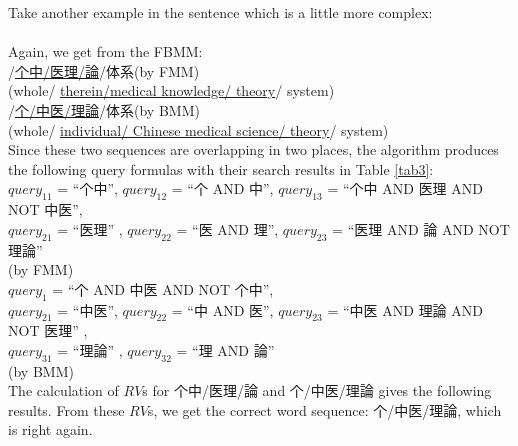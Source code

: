 {Take another example in the sentence which is a little more complex:\\
\hspace*{4zw}{\small 整个中医理論体系}\\
Again, we get from the FBMM:\\
\hspace*{4zw}{\small 整}/\underline{{\small 个中}/{\small 医理}/{\small 論}}/{\small 体系}(by FMM)\\
\hspace*{4zw}(whole/ \underline{therein/medical knowledge/ theory}/ system)\\
\hspace*{4zw}{\small 整}/\underline{{\small 个}/{\small 中医}/{\small 理論}}/{\small 体系}(by BMM)\\
\hspace*{4zw}(whole/ \underline{individual/ Chinese medical science/ theory}/ system)\\
Since these two sequences are overlapping in two places, the algorithm produces the following query formulas with their search results in Table \ref{tab3}:\\
\hspace*{1zw}${query}_{11}$  = ``{\small 个中}'', ${query}_{12}$  = ``{\small 个} AND {\small 中}'', ${query}_{13}$  = ``{\small 个中} AND {\small 医理} AND NOT {\small 中医}'',\\
\hspace*{1zw}${query}_{21}$  = ``{\small 医理}'' , ${query}_{22}$  = ``{\small 医} AND {\small 理}'', ${query}_{23}$  = ``{\small 医理} AND {\small 論} AND NOT {\small 理論}''\\
\hspace*{2zw}(by FMM)\\
\hspace*{1zw}${query}_{1}$  = ``{\small 个} AND {\small 中医} AND NOT {\small 个中}'', \\
\hspace*{1zw}${query}_{21}$  = ``{\small 中医}'', ${query}_{22}$  = ``{\small 中} AND {\small 医}'', ${query}_{23}$  = ``{\small 中医} AND {\small 理論} AND NOT {\small 医理}'' ,\\
\hspace*{1zw}${query}_{31}$  = ``{\small 理論}'' , ${query}_{32}$  = ``{\small 理} AND {\small 論}''\\
\hspace*{2zw}(by BMM)\\
The calculation of $RV$s for {\small 个中}/{\small 医理}/{\small 論} and {\small 个}/{\small 中医}/{\small 理論} gives the following results. From these $RV$s, we get the correct word sequence: {\small 个}/{\small 中医}/{\small 理論}, which is right again.\\
}
